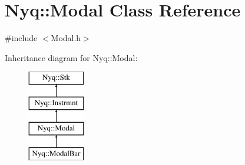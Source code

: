 \hypertarget{class_nyq_1_1_modal}{}\section{Nyq\+:\+:Modal Class Reference}
\label{class_nyq_1_1_modal}


{\ttfamily \#include $<$Modal.\+h$>$}

Inheritance diagram for Nyq\+:\+:Modal\+:\begin{figure}[H]
\begin{center}
\leavevmode
\includegraphics[height=4.000000cm]{class_nyq_1_1_modal}
\end{center}
\end{figure}
